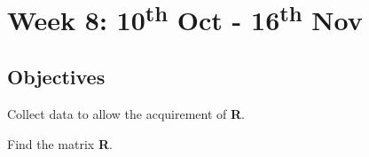 \chapter{Week 8: 10\textsuperscript{th} Oct  - 16\textsuperscript{th} Nov }

\section{Objectives}



\begin{itemize*}
	\item Collect data to allow the acquirement of {\bf R}.
	\item Find the matrix {\bf R}.
\end{itemize*}
